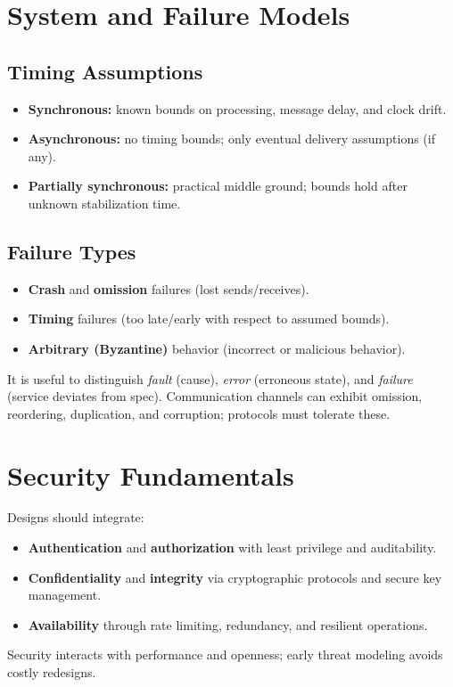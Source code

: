 \documentclass[a4paper,12pt]{book}
\begin{document}
\section{System and Failure Models}
\subsection{Timing Assumptions}
\begin{itemize}
  \item \textbf{Synchronous:} known bounds on processing, message delay, and clock drift.
  \item \textbf{Asynchronous:} no timing bounds; only eventual delivery assumptions (if any).
  \item \textbf{Partially synchronous:} practical middle ground; bounds hold after unknown stabilization time.
\end{itemize}

\subsection{Failure Types}
\begin{itemize}
  \item \textbf{Crash} and \textbf{omission} failures (lost sends/receives).
  \item \textbf{Timing} failures (too late/early with respect to assumed bounds).
  \item \textbf{Arbitrary (Byzantine)} behavior (incorrect or malicious behavior).
\end{itemize}
It is useful to distinguish \emph{fault} (cause), \emph{error} (erroneous state), and \emph{failure} (service deviates from spec). Communication channels can exhibit omission, reordering, duplication, and corruption; protocols must tolerate these.

\section{Security Fundamentals}
Designs should integrate:
\begin{itemize}
  \item \textbf{Authentication} and \textbf{authorization} with least privilege and auditability.
  \item \textbf{Confidentiality} and \textbf{integrity} via cryptographic protocols and secure key management.
  \item \textbf{Availability} through rate limiting, redundancy, and resilient operations.
\end{itemize}
Security interacts with performance and openness; early threat modeling avoids costly redesigns.
\end{document}

